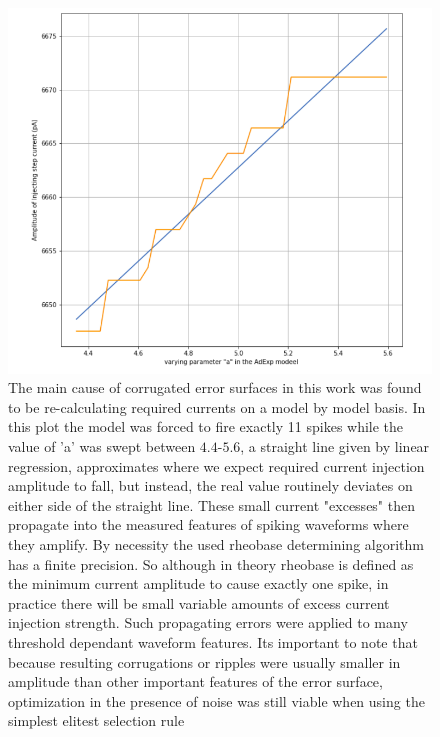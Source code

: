 \begin{center}
\begin{figure}
\includegraphics[]{figures/fundamental_cause_of_corrogations.png}
\caption[]{The main cause of corrugated error surfaces in this work was found to be re-calculating required currents on a model by model basis. In this plot the model was forced to fire exactly 11 spikes while the value of 'a' was swept between $4.4$-$5.6$, a straight line given by linear regression, approximates where we expect required current injection amplitude to fall, but instead, the real value routinely deviates on either side of the straight line. These small current "excesses" then propagate into the measured features of spiking waveforms where they amplify. By necessity the used rheobase determining algorithm has a finite precision. So although in theory rheobase is defined as the minimum current amplitude to cause exactly one spike, in practice there will be small variable amounts of excess current injection strength. Such propagating errors were applied to many threshold dependant waveform features. Its important to note that because resulting corrugations or ripples were usually smaller in amplitude than other important features of the error surface, optimization in the presence of noise was still viable when using the simplest elitest selection rule}
\label{fig:contingent_discontinous}
\end{figure}
\end{center}


